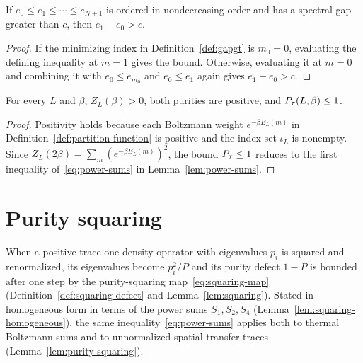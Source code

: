 \begin{lemma}
  \label{lem:gapgt-monotone}
  \leanok
  If \(e_0 \le e_1 \le \cdots \le e_{N+1}\) is ordered in nondecreasing order and has a spectral
  gap greater than \(c\), then \(e_1 - e_0 > c\).
\end{lemma}
\begin{proof}
  \leanok
  If the minimizing index in Definition~\ref{def:gapgt} is \(m_0 = 0\), evaluating the defining
  inequality at \(m = 1\) gives the bound. Otherwise, evaluating it at \(m = 0\) and combining it
  with \(e_0 \le e_{m_0}\) and \(e_0 \le e_1\) again gives \(e_1 - e_0 > c\).
\end{proof}

\begin{lemma}
  \label{lem:purity-basic}
  \leanok
  For every \(L\) and \(\beta\), \(Z_L(\beta) > 0\), both purities are positive, and
  \(P_{\tau}(L, \beta) \le 1\).
\end{lemma}
\begin{proof}
  \leanok
  Positivity holds because each Boltzmann weight \(e^{-\beta E_L(m)}\) in
  Definition~\ref{def:partition-function} is positive and the index set \(\iota_L\) is nonempty.
  Since \(Z_L(2\beta) = \sum_m (e^{-\beta E_L(m)})^2\), the bound \(P_{\tau} \le 1\) reduces to the
  first inequality of~\eqref{eq:power-sums} in Lemma~\ref{lem:power-sums}.
\end{proof}

\section{Purity squaring}

When a positive trace-one density operator with eigenvalues \(p_i\) is squared and renormalized,
its eigenvalues become \(p_i^2/P\) and its purity defect \(1 - P\) is bounded after one step by the
purity-squaring map~\eqref{eq:squaring-map} (Definition~\ref{def:squaring-defect} and
Lemma~\ref{lem:squaring}). Stated in homogeneous form in terms of the power sums \(S_1, S_2, S_4\)
(Lemma~\ref{lem:squaring-homogeneous}), the same inequality~\eqref{eq:power-sums} applies both to
thermal Boltzmann sums and to unnormalized spatial transfer traces (Lemma~\ref{lem:purity-squaring}).

